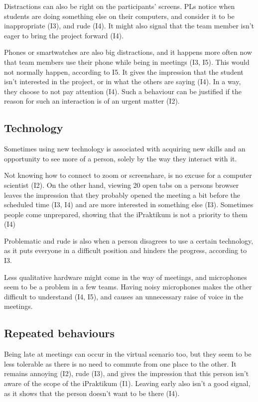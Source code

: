Distractions can also be right on the participants' screens. PLs notice when students are doing something else on their computers, and consider it to be inappropriate (I3), and rude (I4). It might also signal that the team member isn't eager to bring the project forward (I4).

Phones or smartwatches are also big distractions, and it happens more often now that team members use their phone while being in meetings (I3, I5). This would not normally happen, according to I5. It gives the impression that the student isn't interested in the project, or in what the others are saying (I4). In a way, they choose to not pay attention (I4). Such a behaviour can be justified if the reason for such an interaction is of an urgent matter (I2). 

\subsection{Technology}

Sometimes using new technology is associated with acquiring new skills  and an opportunity to see more of a person, solely by the way they interact with it.

Not knowing how to connect to zoom or screenshare, is no excuse for a computer scientist (I2). On the other hand, viewing 20 open tabs on a persons browser leaves the impression that they probably opened the meeting a bit before the scheduled time (I3, I4) and are more interested in something else (I3). Sometimes people come unprepared, showing that the iPraktikum is not a priority to them (I4)

Problematic and rude is also when a person disagrees to use a certain technology, as it puts everyone in a difficult position and hinders the progress, according to I3. 

Less qualitative hardware might come in the way of meetings, and microphones seem to be a problem in a few teams. Having noisy microphones makes the other difficult to understand (I4, I5), and causes an unnecessary raise of voice in the meetings.

\subsection{Repeated behaviours}

Being late at meetings can occur in the virtual scenario too, but they seem to be less tolerable as there is no need to commute from one place to the other. It remains annoying (I2), rude (I3), and gives the impression that this person isn't aware of the scope of the iPraktikum (I1). Leaving early also isn't a good signal, as it shows that the person doesn't want to be there (I4).

